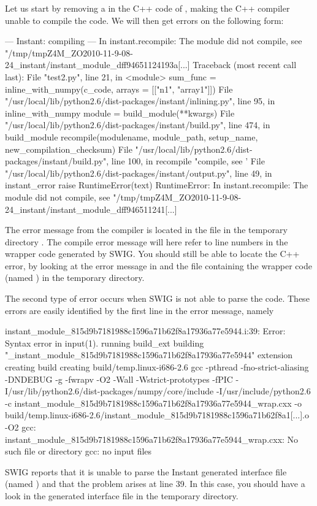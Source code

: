 Let us start by removing a  in the C++ code of
, making the C++ compiler unable to compile the code. We will then get errors on the
following form:
\begin{progoutput}
--- Instant: compiling ---
In instant.recompile: The module did not compile,
   see "/tmp/tmpZ4M_ZO2010-11-9-08-24_instant/instant_module_dff94651124193a[...]
Traceback (most recent call last):
      File "test2.py", line 21, in <module>
          sum_func = inline_with_numpy(c_code, arrays = [["n1", "array1"]])
        File "/usr/local/lib/python2.6/dist-packages/instant/inlining.py", line 95, in inline_with_numpy
          module = build_module(**kwargs)
        File "/usr/local/lib/python2.6/dist-packages/instant/build.py", line 474, in build_module
          recompile(modulename, module_path, setup_name, new_compilation_checksum)
        File "/usr/local/lib/python2.6/dist-packages/instant/build.py", line 100, in recompile
          "compile, see '%
        File "/usr/local/lib/python2.6/dist-packages/instant/output.py", line 49, in instant_error
          raise RuntimeError(text)
      RuntimeError: In instant.recompile: The module did not compile,
      see "/tmp/tmpZ4M_ZO2010-11-9-08-24_instant/instant_module_dff946511241[...]
\end{progoutput}
The error message from the compiler is located in the file  in the temporary directory
.
The compile error message will here refer to line numbers in the
wrapper code generated by SWIG.  You should still be able to locate
the C++ error, by looking at the error message in 
and the file containing the wrapper code (named ) in
the temporary directory.

The second type of error occurs when SWIG is not able to parse the
code. These errors are easily identified by the first line in the
error message, namely
\begin{progoutput}
instant_module_815d9b7181988c1596a71b62f8a17936a77e5944.i:39: Error: Syntax error in input(1).
running build_ext
building "_instant_module_815d9b7181988c1596a71b62f8a17936a77e5944" extension
creating build
creating build/temp.linux-i686-2.6
gcc -pthread -fno-strict-aliasing -DNDEBUG -g -fwrapv -O2 -Wall -Wstrict-prototypes -fPIC
   -I/usr/lib/python2.6/dist-packages/numpy/core/include -I/usr/include/python2.6
   -c instant_module_815d9b7181988c1596a71b62f8a17936a77e5944_wrap.cxx
   -o build/temp.linux-i686-2.6/instant_module_815d9b7181988c1596a71b62f8a1[...].o -O2
gcc: instant_module_815d9b7181988c1596a71b62f8a17936a77e5944_wrap.cxx: No such file or directory
gcc: no input files
\end{progoutput}
SWIG reports that it is unable to parse the Instant generated
interface file (named ) and that the problem arises at line
39.  In this case, you should have a look in the generated interface
file in the temporary directory.

